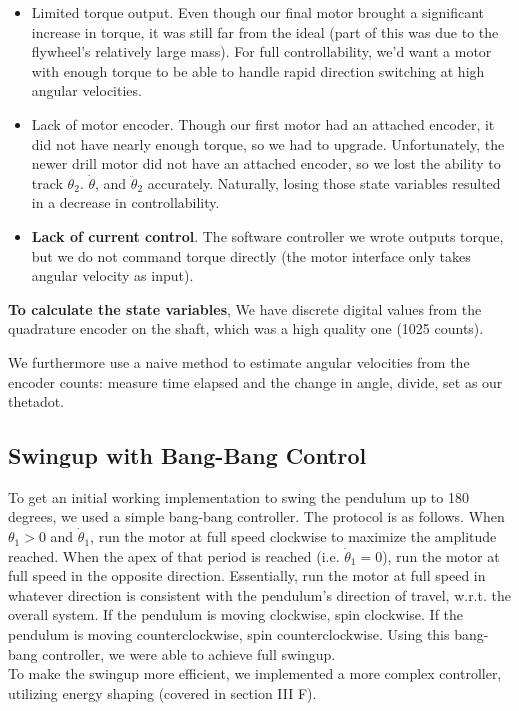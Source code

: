 \documentclass[conference]{IEEEtran}
\begin{document}
\begin{itemize} 
\item
    Limited torque output. Even though our final motor brought a significant
    increase in torque, it was still far from the ideal (part of this was due to
    the flywheel's relatively large mass). For full controllability, we'd want a
    motor with enough torque to be able to handle rapid direction switching at
    high angular velocities.  
\item Lack of motor encoder. Though our first
    motor had an attached encoder, it did not have nearly enough torque, so we
    had to upgrade. Unfortunately, the newer drill motor did not have an
    attached encoder, so we lost the ability to track $\theta_2$.
    $\dot{\theta}$, and $\ddot{\theta}_2$ accurately. Naturally, losing those
    state variables resulted in a decrease in controllability.  
\item \textbf{Lack of current control}. The software controller we wrote outputs torque, but we do
    not command torque directly (the motor interface only takes angular velocity
    as input).
\end{itemize}


\textbf{To calculate the state variables}, 
We have discrete digital values from the quadrature encoder on the shaft, which
was a high quality one (1025 counts).

We furthermore use a naive method to estimate angular velocities from the
encoder counts: measure time elapsed and the change in angle, divide, set as our
thetadot.  

\subsection{Swingup with Bang-Bang Control}
To get an initial working implementation to swing the pendulum up to 180 degrees, we used a simple bang-bang controller. The protocol is as follows. When $\theta_1 > 0$ and $\dot{\theta}_1$, run the motor at full speed clockwise to maximize the amplitude reached. When the apex of that period is reached (i.e. $\dot{\theta}_1 = 0$), run the motor at full speed in the opposite direction. Essentially, run the motor at full speed in whatever direction is consistent with the pendulum's direction of travel, w.r.t. the overall system. If the pendulum is moving clockwise, spin clockwise. If the pendulum is moving counterclockwise, spin counterclockwise. Using this bang-bang controller, we were able to achieve full swingup.\\ \indent
To make the swingup more efficient, we implemented a more complex controller, utilizing energy shaping (covered in section III F).
\end{document}
